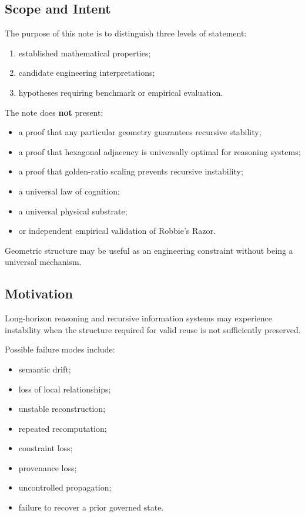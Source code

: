 \subsection*{Scope and Intent}

The purpose of this note is to distinguish three levels of statement:

\begin{enumerate}
    \item established mathematical properties;
    \item candidate engineering interpretations;
    \item hypotheses requiring benchmark or empirical evaluation.
\end{enumerate}

The note does \textbf{not} present:

\begin{itemize}
    \item a proof that any particular geometry guarantees recursive stability;
    \item a proof that hexagonal adjacency is universally optimal for reasoning systems;
    \item a proof that golden-ratio scaling prevents recursive instability;
    \item a universal law of cognition;
    \item a universal physical substrate;
    \item or independent empirical validation of Robbie's Razor.
\end{itemize}

Geometric structure may be useful as an engineering constraint without being
a universal mechanism.

\subsection*{Motivation}

Long-horizon reasoning and recursive information systems may experience
instability when the structure required for valid reuse is not sufficiently
preserved.

Possible failure modes include:

\begin{itemize}
    \item semantic drift;
    \item loss of local relationships;
    \item unstable reconstruction;
    \item repeated recomputation;
    \item constraint loss;
    \item provenance loss;
    \item uncontrolled propagation;
    \item failure to recover a prior governed state.
\end{itemize}

